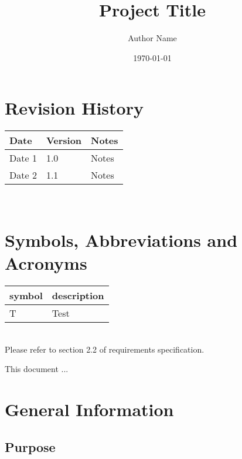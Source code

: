 \documentclass[12pt, titlepage]{article}
\begin{document}
\title{Project Title} 
\author{Author Name}
\date{\today}
	
\maketitle


\section{Revision History}

\begin{tabularx}{\textwidth}{p{3cm}p{2cm}X}
\toprule {\bf Date} & {\bf Version} & {\bf Notes}\\
\midrule
Date 1 & 1.0 & Notes\\
Date 2 & 1.1 & Notes\\
\bottomrule
\end{tabularx}

~\newpage

\section{Symbols, Abbreviations and Acronyms}

\renewcommand{\arraystretch}{1.2}
\begin{tabular}{l l} 
  \toprule		
  \textbf{symbol} & \textbf{description}\\
  \midrule 
  T & Test\\
  \bottomrule
\end{tabular}\\
Please refer to section 2.2 of requirements specification.

\newpage

\tableofcontents

\listoftables

\listoffigures

\newpage


This document ...

\section{General Information}

\subsection{Purpose}
\end{document}
